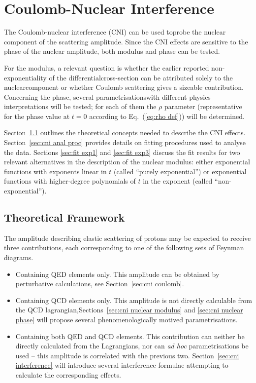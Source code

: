 \section{Coulomb-Nuclear Interference}
\label{sec:coulomb}

The Coulomb-nuclear interference (CNI) can be used to\Break probe the nuclear component of the scattering amplitude. Since the CNI effects are sensitive to the phase of the nuclear amplitude, both modulus and phase can be tested. 

For the modulus, a relevant question is whether the earlier reported non-exponentiality of the differential\Break cross-section \cite{8tev-90m} can be attributed solely to the nuclear\Break component or whether Coulomb scattering gives a sizeable contribution. Concerning the phase, several parametrisations\Break with different physics interpretations will be tested; for each of them the $\rho$ parameter (representative for the phase value at $t = 0$ according to Eq.~(\ref{eq:rho def})) will be determined.

Section~\ref{sec:cni framework} outlines the theoretical concepts needed to describe the CNI effects. Section~\ref{sec:cni anal proc} provides details on fitting procedures used to analyse the data. Sections \ref{sec:fit exp1} and \ref{sec:fit exp3} discuss the fit results for two relevant alternatives in the description of the nuclear modulus: either exponential functions with exponents linear in $t$ (called ``purely exponential'') or exponential functions with higher-degree polynomials of $t$ in the exponent (called ``non-exponential'').



\subsection{Theoretical Framework}
\label{sec:cni framework}

The amplitude describing elastic scattering of protons may be expected to receive three contributions, each corresponding to one of the following sets of Feynman diagrams.
\begin{itemize}
\item Containing QED elements only. This amplitude can be obtained by perturbative calculations, see Section~\ref{sec:cni coulomb}.
\item Containing QCD elements only. This amplitude is not directly calculable from the QCD lagrangian,\Break Sections~\ref{sec:cni nuclear modulus} and \ref{sec:cni nuclear phase} will propose several phenomenologically motived parame\-trisations.
\item Containing both QED and QCD elements. This contribution can neither be directly calculated from the Lagrangians, nor can \textit{ad hoc} parametrisations be used -- this amplitude is correlated with the previous two. Section~\ref{sec:cni interference} will introduce several interference formulae attempting to calculate the corresponding effects.
\end{itemize}

